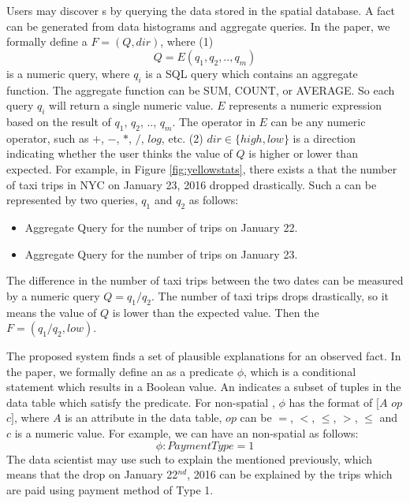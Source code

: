 Users may discover {\fact}s by querying the data stored in the spatial database. A fact can be generated from data histograms and aggregate queries. In the paper, we formally define a {\fact} $F = (Q, dir)$, where (1)~$$Q = E(q_1, q_2, .., q_m)$$ is a numeric query, where $q_i$ is a SQL query which contains an aggregate function. The aggregate function can be SUM, COUNT, or AVERAGE. So each query $q_i$ will return a single numeric value. $E$ represents a numeric expression based on the result of $q_1$, $q_2$, .., $q_m$. The operator in $E$ can be any numeric operator, such as $+$, $-$, $*$, $/$, $log$, etc. (2) $dir \in \{high, low\}$ is a direction indicating whether the user thinks the value of $Q$ is higher or lower than expected.
For example, in Figure \ref{fig:yellowstats}, there exists a {\fact} that the number of taxi trips in NYC on January 23, 2016 dropped drastically. Such a {\fact} can be represented by two queries, $q_1$ and $q_2$ as follows:
\begin{itemize}
	\item Aggregate Query for the number of trips on January 22.
	\item Aggregate Query for the number of trips on January 23.
\end{itemize}
The difference in the number of taxi trips between the two dates can be measured by a numeric query $Q = {q_1} / {q_2}$. The number of taxi trips drops drastically, so it means the value of $Q$ is lower than the expected value. Then the {\fact} $F = ({q_1} / {q_2}, low)$.


The proposed system finds a set of plausible explanations for an observed fact. In the paper, we formally define an {\explanation} as a predicate $\phi$, which is a conditional statement which results in a Boolean value. An {\explanation} indicates a subset of tuples in the data table which satisfy the predicate. For non-spatial {\explanation}, $\phi$ has the format of $[A$ $op$ $c]$, where $A$ is an attribute in the data table, $op$ can be $=$, $<$, $\leq$, $>$, $\leq$ and $c$ is a numeric value. For example, we can have an non-spatial {\explanation} as follows:
$$\phi: PaymentType = 1$$
The data scientist may use such {\explanation} to explain the {\fact} mentioned previously, which means that the drop on January 22$^{nd}$, 2016 can be explained by the trips which are paid using payment method of Type 1.

